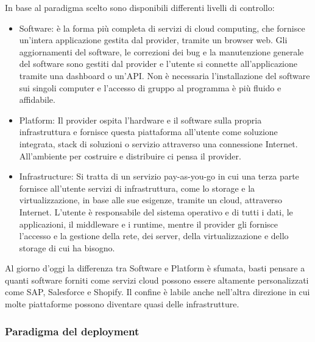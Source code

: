 \documentclass{article}
\begin{document}
		In base al paradigma scelto sono disponibili differenti livelli di controllo:
		\begin{itemize}
		    \item Software: è la forma più completa di servizi di cloud computing, che fornisce un'intera applicazione gestita dal provider, tramite un browser web.
		    Gli aggiornamenti del software, le correzioni dei bug e la manutenzione generale del software sono gestiti dal provider e l'utente si connette all'applicazione tramite una dashboard o un'API. Non è necessaria l'installazione del software sui singoli computer e l'accesso di gruppo al programma è più fluido e affidabile.
		    \item Platform: Il provider ospita l'hardware e il software sulla propria infrastruttura e fornisce questa piattaforma all'utente come soluzione integrata, stack di soluzioni o servizio attraverso una connessione Internet. All'ambiente per costruire e distribuire ci pensa il provider.
		    \item Infrastructure: Si tratta di un servizio pay-as-you-go in cui una terza parte fornisce all'utente servizi di infrastruttura, come lo storage e la virtualizzazione, in base alle sue esigenze, tramite un cloud, attraverso Internet.
		    L'utente è responsabile del sistema operativo e di tutti i dati, le applicazioni, il middleware e i runtime, mentre il provider gli fornisce l'accesso e la gestione della rete, dei server, della virtualizzazione e dello storage di cui ha bisogno. 
		\end{itemize}
		
		
		Al giorno d'oggi la differenza tra Software e Platform è sfumata, basti pensare a quanti software forniti come servizi cloud possono essere altamente personalizzati come SAP, Salesforce e Shopify. Il confine è labile anche nell'altra direzione in cui molte piattaforme possono diventare quasi delle infrastrutture.
		
		\newpage
		\subsubsection{Paradigma del deployment}
		
\end{document}
